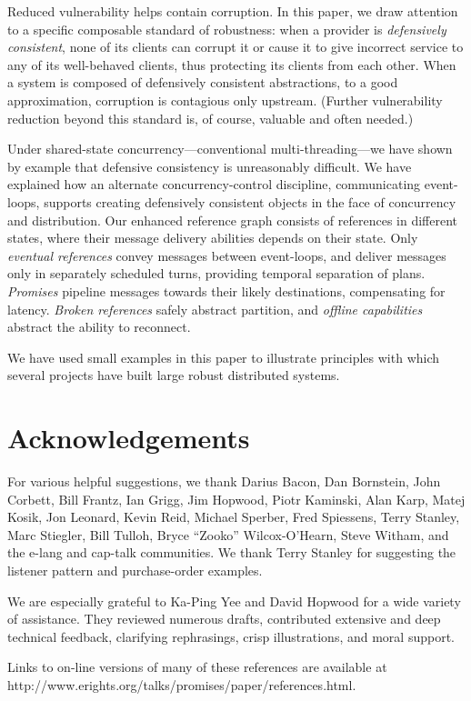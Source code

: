 \documentclass{llncs}
\begin{document}
Reduced vulnerability helps contain corruption. In this paper, we draw
attention to a specific composable standard of robustness: when a
provider is \emph{defensively consistent}, none of its clients can
corrupt it or cause it to give incorrect service to any of its
well-behaved clients, thus protecting its clients from each
other. When a system is composed of defensively consistent
abstractions, to a good approximation, corruption is contagious only
upstream. (Further vulnerability reduction beyond this standard is, of
course, valuable and often needed.)

Under shared-state concurrency---conventional multi-threading---we
have shown by example that defensive consistency is unreasonably
difficult. We have explained how an alternate concurrency-control
discipline, communicating event-loops, supports creating defensively
consistent objects in the face of concurrency and distribution. Our
enhanced reference graph consists of references in different states,
where their message delivery abilities depends on their state. Only
\emph{eventual references} convey messages between event-loops, and
deliver messages only in separately scheduled turns, providing
temporal separation of plans. \emph{Promises} pipeline messages
towards their likely destinations, compensating for
latency. \emph{Broken references} safely abstract partition, and
\emph{offline capabilities} abstract the ability to reconnect.

We have used small examples in this paper to illustrate principles with
which several projects have built large robust distributed systems.

\section{Acknowledgements}
For various helpful suggestions, we thank
Darius Bacon,
Dan Bornstein,
John Corbett,
Bill Frantz,
Ian Grigg,
Jim Hopwood,
Piotr Kaminski,
Alan Karp,
Matej Kosik,
Jon Leonard,
Kevin Reid,
Michael Sperber,
Fred Spiessens,
Terry Stanley,
Marc Stiegler,
Bill Tulloh,
Bryce ``Zooko'' Wilcox-O'Hearn,
Steve Witham,
and the e-lang and cap-talk communities.
We thank Terry Stanley for suggesting the listener pattern
and purchase-order examples.

We are especially grateful to Ka-Ping Yee and David Hopwood for a wide
variety of assistance. They reviewed numerous drafts, contributed
extensive and deep technical feedback, clarifying rephrasings, crisp
illustrations, and moral support.


%
Links to on-line versions of many of these references are available at
http://www.erights.org/talks/promises/paper/references.html.

%

\end{document}
